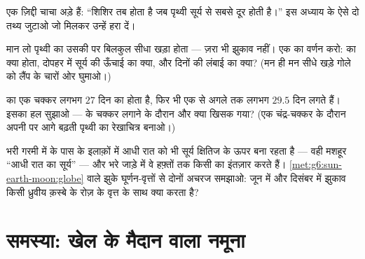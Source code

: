 \begin{exercise}[$\star\star$]\label{exo:g6:sun-earth-moon:9}
एक ज़िद्दी चाचा अड़े हैं: ``शिशिर तब होता है जब पृथ्वी सूर्य से सबसे
दूर होती है।'' इस अध्याय के ऐसे दो तथ्य जुटाओ जो मिलकर उन्हें हरा
दें।
\end{exercise}

\begin{exercise}[$\star\star$]\label{exo:g6:sun-earth-moon:10}
मान लो पृथ्वी का  उसकी  पर बिलकुल सीधा खड़ा होता --- ज़रा भी
झुकाव नहीं। एक  का वर्णन करो:  का क्या होता, दोपहर में सूर्य
की ऊँचाई का क्या, और दिनों की लंबाई का क्या? (मन ही मन सीधे खड़े गोले
को लैंप के चारों ओर घुमाओ।)
\end{exercise}

\begin{exercise}[$\star\star$]\label{exo:g6:sun-earth-moon:11}
 का एक चक्कर लगभग $27$ दिन का होता है, फिर भी एक  से
अगले  तक लगभग $29.5$ दिन लगते हैं। इसका हल सुझाओ ---
 के चक्कर लगाने के दौरान और क्या खिसक गया? (एक चंद्र-चक्कर के
दौरान अपनी  पर आगे बढ़ती पृथ्वी का रेखाचित्र बनाओ।)
\end{exercise}

\begin{exercise}[$\star\star\star$]\label{exo:g6:sun-earth-moon:12}
भरी गरमी में  के पास के इलाक़ों में आधी रात को भी सूर्य
क्षितिज के ऊपर बना रहता है --- वही मशहूर ``आधी रात का सूर्य'' --- और
भरे जाड़े में वे हफ़्तों तक किसी  का इंतज़ार करते हैं।
\cref{met:g6:sun-earth-moon:globe} वाले झुके घूर्णन-वृत्तों से दोनों
अचरज समझाओ: जून में और दिसंबर में झुकाव किसी ध्रुवीय क़स्बे के रोज़ के
वृत्त के साथ क्या करता है?
\end{exercise}

\section{समस्या: खेल के मैदान वाला नमूना}


